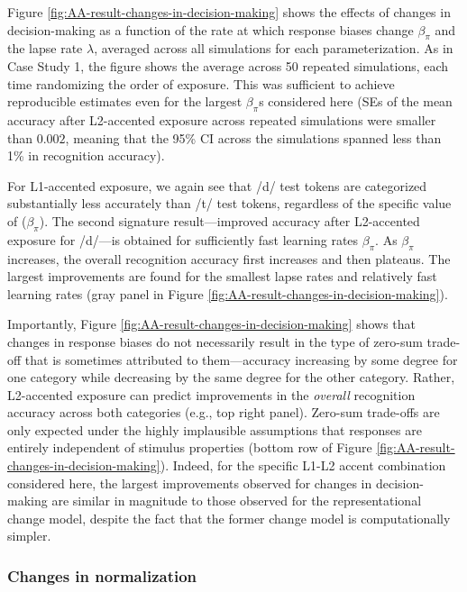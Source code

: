 \documentclass[
  11pt,
  man,floatsintext]{apa6}
\begin{document}
Figure \ref{fig:AA-result-changes-in-decision-making} shows the effects of changes in decision-making as a function of the rate at which response biases change \(\beta_{\pi}\) and the lapse rate \(\lambda\), averaged across all simulations for each parameterization. As in Case Study 1, the figure shows the average across 50 repeated simulations, each time randomizing the order of exposure. This was sufficient to achieve reproducible estimates even for the largest \(\beta_{\pi}\)s considered here (SEs of the mean accuracy after L2-accented exposure across repeated simulations were smaller than \(0.002\), meaning that the 95\% CI across the simulations spanned less than 1\% in recognition accuracy).

For L1-accented exposure, we again see that /d/ test tokens are categorized substantially less accurately than /t/ test tokens, regardless of the specific value of (\(\beta_{\pi}\)). The second signature result---improved accuracy after L2-accented exposure for /d/---is obtained for sufficiently fast learning rates \(\beta_{\pi}\). As \(\beta_{\pi}\) increases, the overall recognition accuracy first increases and then plateaus. The largest improvements are found for the smallest lapse rates and relatively fast learning rates (gray panel in Figure \ref{fig:AA-result-changes-in-decision-making}).

Importantly, Figure \ref{fig:AA-result-changes-in-decision-making} shows that changes in response biases do not necessarily result in the type of zero-sum trade-off that is sometimes attributed to them---accuracy increasing by some degree for one category while decreasing by the same degree for the other category. Rather, L2-accented exposure can predict improvements in the \emph{overall} recognition accuracy across both categories (e.g., top right panel). Zero-sum trade-offs are only expected under the highly implausible assumptions that responses are entirely independent of stimulus properties (bottom row of Figure \ref{fig:AA-result-changes-in-decision-making}). Indeed, for the specific L1-L2 accent combination considered here, the largest improvements observed for changes in decision-making are similar in magnitude to those observed for the representational change model, despite the fact that the former change model is computationally simpler.

\hypertarget{changes-in-normalization-1}{%
\subsubsection{Changes in normalization}\label{changes-in-normalization-1}}
\end{document}
